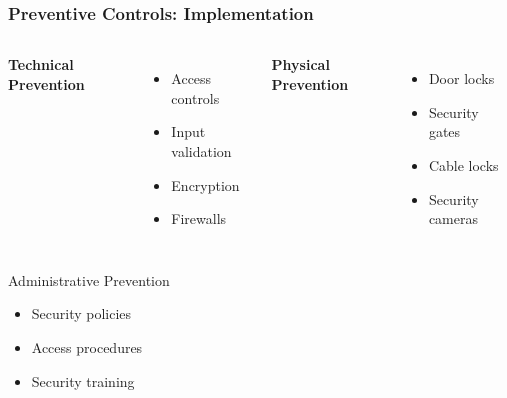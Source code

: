 \documentclass{beamer}
\begin{document}
\begin{frame}
    \frametitle{Preventive Controls: Implementation}
    
    \begin{columns}[t]
        \textbf{Technical Prevention}
        \begin{itemize}
            \item Access controls
            \item Input validation
            \item Encryption
            \item Firewalls
        \end{itemize}
        
        \textbf{Physical Prevention}
        \begin{itemize}
            \item Door locks
            \item Security gates
            \item Cable locks
            \item Security cameras
        \end{itemize}
    \end{columns}
    
    \begin{exampleblock}{Administrative Prevention}
        \begin{itemize}
            \item Security policies
            \item Access procedures
            \item Security training
        \end{itemize}
    \end{exampleblock}
\end{frame}
\end{document}
